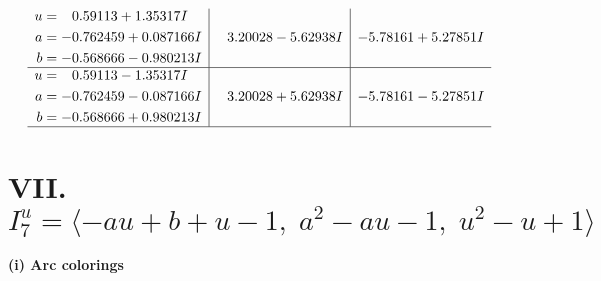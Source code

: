 \documentclass[1p]{elsarticle_modified}
\theoremstyle{definition}
\begin{document}
$$\begin{array}{c|c|c}
\begin{aligned}
u &= \phantom{-}0.59113 + 1.35317 I \\
a &= -0.762459 + 0.087166 I \\
b &= -0.568666 - 0.980213 I\end{aligned}
 & \phantom{-}3.20028 - 5.62938 I & -5.78161 + 5.27851 I \\ \hline\begin{aligned}
u &= \phantom{-}0.59113 - 1.35317 I \\
a &= -0.762459 - 0.087166 I \\
b &= -0.568666 + 0.980213 I\end{aligned}
 & \phantom{-}3.20028 + 5.62938 I & -5.78161 - 5.27851 I\\
 \hline 
 \end{array}$$\newpage\newpage\renewcommand{\arraystretch}{1}
\centering \section*{VII. $I^u_{7}= \langle - a u+b+u-1,\;a^2- a u-1,\;u^2- u+1 \rangle$}
\flushleft \textbf{(i) Arc colorings}\\
\end{document}
